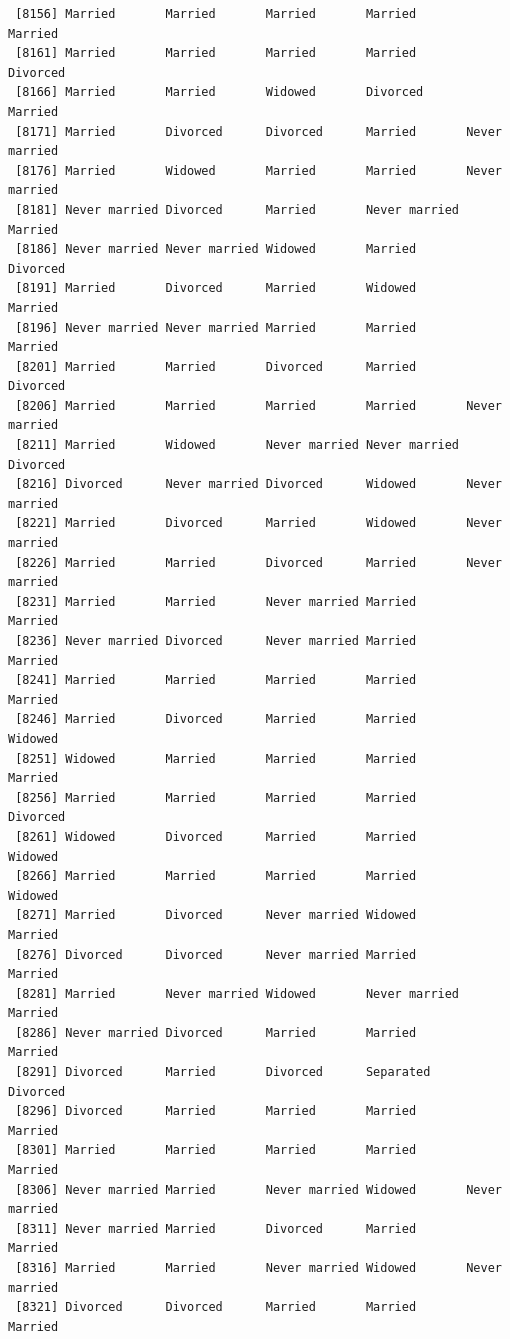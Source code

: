 \documentclass[
  letterpaper,
  DIV=11,
  numbers=noendperiod,
  oneside]{scrartcl}
\begin{document}
\begin{verbatim}
 [8156] Married       Married       Married       Married       Married      
 [8161] Married       Married       Married       Married       Divorced     
 [8166] Married       Married       Widowed       Divorced      Married      
 [8171] Married       Divorced      Divorced      Married       Never married
 [8176] Married       Widowed       Married       Married       Never married
 [8181] Never married Divorced      Married       Never married Married      
 [8186] Never married Never married Widowed       Married       Divorced     
 [8191] Married       Divorced      Married       Widowed       Married      
 [8196] Never married Never married Married       Married       Married      
 [8201] Married       Married       Divorced      Married       Divorced     
 [8206] Married       Married       Married       Married       Never married
 [8211] Married       Widowed       Never married Never married Divorced     
 [8216] Divorced      Never married Divorced      Widowed       Never married
 [8221] Married       Divorced      Married       Widowed       Never married
 [8226] Married       Married       Divorced      Married       Never married
 [8231] Married       Married       Never married Married       Married      
 [8236] Never married Divorced      Never married Married       Married      
 [8241] Married       Married       Married       Married       Married      
 [8246] Married       Divorced      Married       Married       Widowed      
 [8251] Widowed       Married       Married       Married       Married      
 [8256] Married       Married       Married       Married       Divorced     
 [8261] Widowed       Divorced      Married       Married       Widowed      
 [8266] Married       Married       Married       Married       Widowed      
 [8271] Married       Divorced      Never married Widowed       Married      
 [8276] Divorced      Divorced      Never married Married       Married      
 [8281] Married       Never married Widowed       Never married Married      
 [8286] Never married Divorced      Married       Married       Married      
 [8291] Divorced      Married       Divorced      Separated     Divorced     
 [8296] Divorced      Married       Married       Married       Married      
 [8301] Married       Married       Married       Married       Married      
 [8306] Never married Married       Never married Widowed       Never married
 [8311] Never married Married       Divorced      Married       Married      
 [8316] Married       Married       Never married Widowed       Never married
 [8321] Divorced      Divorced      Married       Married       Married      

\end{verbatim}
\end{document}
